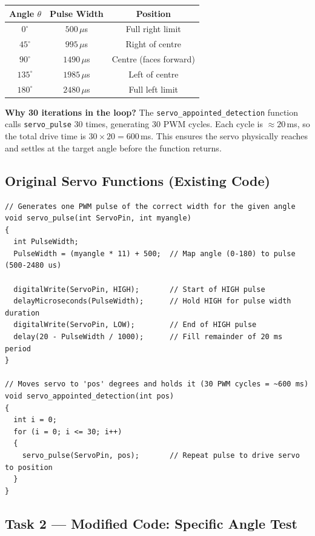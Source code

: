 \documentclass[12pt,a4paper]{article}
\begin{document}
\begin{center}
\renewcommand{\arraystretch}{1.2}
\begin{tabular}{ccc}
\toprule
\textbf{Angle} $\theta$ & \textbf{Pulse Width} & \textbf{Position} \\
\midrule
$0^\circ$   & $500\,\mu$s  & Full right limit \\
$45^\circ$  & $995\,\mu$s  & Right of centre \\
$90^\circ$  & $1490\,\mu$s & Centre (faces forward) \\
$135^\circ$ & $1985\,\mu$s & Left of centre \\
$180^\circ$ & $2480\,\mu$s & Full left limit \\
\bottomrule
\end{tabular}
\end{center}

\textbf{Why 30 iterations in the loop?} The \texttt{servo\_appointed\_detection}
function calls \texttt{servo\_pulse} 30 times, generating 30 PWM cycles.
Each cycle is $\approx 20$\,ms, so the total drive time is $30 \times 20 = 600$\,ms.
This ensures the servo physically reaches and settles at the target angle before
the function returns.

\subsection{Original Servo Functions (Existing Code)}

\begin{lstlisting}[style=arduino,caption={Original servo\_pulse and servo\_appointed\_detection}]
// Generates one PWM pulse of the correct width for the given angle
void servo_pulse(int ServoPin, int myangle)
{
  int PulseWidth;
  PulseWidth = (myangle * 11) + 500;  // Map angle (0-180) to pulse (500-2480 us)

  digitalWrite(ServoPin, HIGH);       // Start of HIGH pulse
  delayMicroseconds(PulseWidth);      // Hold HIGH for pulse width duration
  digitalWrite(ServoPin, LOW);        // End of HIGH pulse
  delay(20 - PulseWidth / 1000);      // Fill remainder of 20 ms period
}

// Moves servo to 'pos' degrees and holds it (30 PWM cycles = ~600 ms)
void servo_appointed_detection(int pos)
{
  int i = 0;
  for (i = 0; i <= 30; i++)
  {
    servo_pulse(ServoPin, pos);       // Repeat pulse to drive servo to position
  }
}
\end{lstlisting}

\subsection{Task 2 --- Modified Code: Specific Angle Test}
\end{document}
